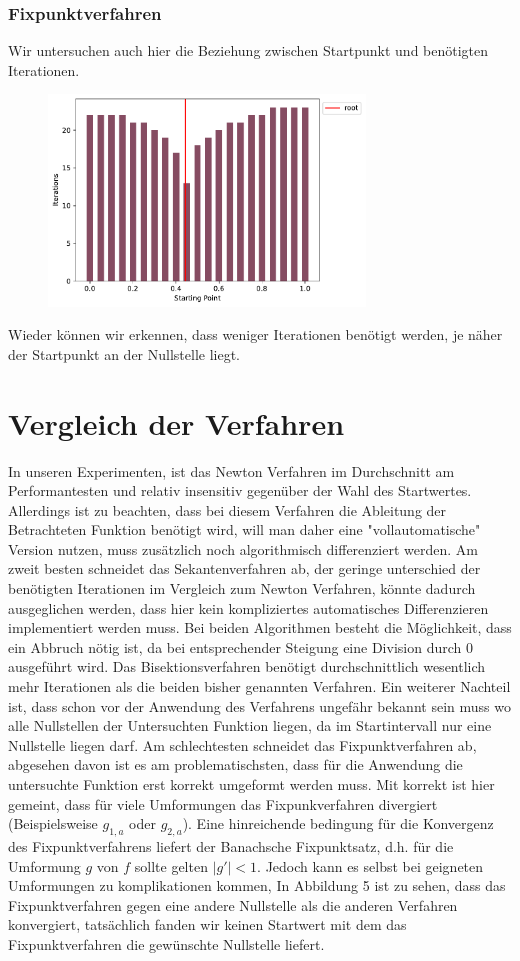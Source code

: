\documentclass[a4paper,12pt]{article}
\newcommand{\1}{1\hspace{-0,9ex}1}
\begin{document}
\subsubsection*{Fixpunktverfahren}
Wir untersuchen auch hier die Beziehung zwischen Startpunkt und benötigten Iterationen.
\begin{figure}[H]
	\centering
	\includegraphics[width=0.75\textwidth]{plots/fixed_point_iterations_by_starting_point.pdf}
\end{figure}
Wieder können wir erkennen, dass weniger Iterationen benötigt werden, je näher der Startpunkt an der Nullstelle liegt.
\section*{Vergleich der Verfahren}
In unseren Experimenten, ist das Newton Verfahren im Durchschnitt am Performantesten und relativ insensitiv gegenüber der Wahl des Startwertes. Allerdings ist zu beachten, dass bei diesem Verfahren die Ableitung der Betrachteten Funktion benötigt wird, will man daher eine "vollautomatische" Version nutzen, muss zusätzlich noch algorithmisch differenziert werden. Am zweit besten schneidet das Sekantenverfahren ab, der geringe unterschied der benötigten Iterationen im Vergleich zum Newton Verfahren, könnte dadurch ausgeglichen werden, dass hier kein kompliziertes automatisches Differenzieren implementiert werden muss. Bei beiden Algorithmen besteht die Möglichkeit, dass ein Abbruch nötig ist, da bei entsprechender Steigung eine Division durch 0 ausgeführt wird. Das Bisektionsverfahren benötigt durchschnittlich wesentlich mehr Iterationen als die beiden bisher genannten Verfahren. Ein weiterer Nachteil ist, dass schon vor der Anwendung des Verfahrens ungefähr bekannt sein muss wo alle Nullstellen der Untersuchten Funktion liegen, da im Startintervall nur eine Nullstelle liegen darf. Am schlechtesten schneidet das Fixpunktverfahren ab, abgesehen davon ist es am problematischsten, dass für die Anwendung die untersuchte Funktion erst korrekt umgeformt werden muss. Mit korrekt ist hier gemeint, dass für viele Umformungen das Fixpunkverfahren divergiert (Beispielsweise $g_{1,a}$ oder $g_{2,a}$). Eine hinreichende bedingung für die Konvergenz des Fixpunktverfahrens liefert der Banachsche Fixpunktsatz, d.h. für die Umformung $g$ von $f$ sollte gelten $|g'| < 1$. Jedoch kann es selbst bei geigneten Umformungen zu komplikationen kommen, In Abbildung 5 ist zu sehen, dass das Fixpunktverfahren gegen eine andere Nullstelle als die anderen Verfahren konvergiert, tatsächlich fanden wir keinen Startwert mit dem das Fixpunktverfahren die gewünschte Nullstelle liefert.
\end{document}
